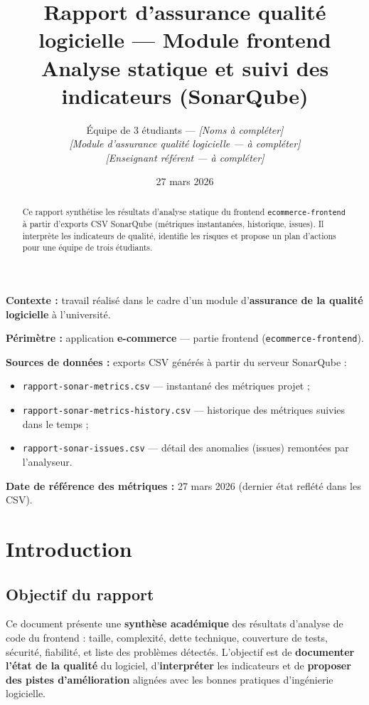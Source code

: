\documentclass[11pt,a4paper]{article}
\title{Rapport d'assurance qualité logicielle --- Module frontend\\[0.5em]
\large Analyse statique et suivi des indicateurs (SonarQube)}
\author{Équipe de 3 étudiants --- \textit{[Noms à compléter]}\\
\textit{[Module d'assurance qualité logicielle --- à compléter]}\\
\textit{[Enseignant référent --- à compléter]}}
\date{27 mars 2026}
\begin{document}
\maketitle

\begin{abstract}
\noindent
Ce rapport synthétise les résultats d'analyse statique du frontend \texttt{ecommerce-frontend} à partir d'exports CSV SonarQube (métriques instantanées, historique, issues). Il interprète les indicateurs de qualité, identifie les risques et propose un plan d'actions pour une équipe de trois étudiants.
\end{abstract}

\vspace{0.8em}
\noindent\textbf{Contexte :} travail réalisé dans le cadre d'un module d'\textbf{assurance de la qualité logicielle} à l'université.

\noindent\textbf{Périmètre :} application \textbf{e-commerce} --- partie frontend (\texttt{ecommerce-frontend}).

\noindent\textbf{Sources de données :} exports CSV générés à partir du serveur SonarQube :
\begin{itemize}[noitemsep]
  \item \texttt{rapport-sonar-metrics.csv} --- instantané des métriques projet ;
  \item \texttt{rapport-sonar-metrics-history.csv} --- historique des métriques suivies dans le temps ;
  \item \texttt{rapport-sonar-issues.csv} --- détail des anomalies (issues) remontées par l'analyseur.
\end{itemize}

\noindent\textbf{Date de référence des métriques :} 27 mars 2026 (dernier état reflété dans les CSV).

\section{Introduction}

\subsection{Objectif du rapport}

Ce document présente une \textbf{synthèse académique} des résultats d'analyse de code du frontend : taille, complexité, dette technique, couverture de tests, sécurité, fiabilité, et liste des problèmes détectés. L'objectif est de \textbf{documenter l'état de la qualité} du logiciel, d'\textbf{interpréter} les indicateurs et de \textbf{proposer des pistes d'amélioration} alignées avec les bonnes pratiques d'ingénierie logicielle.
\end{document}
